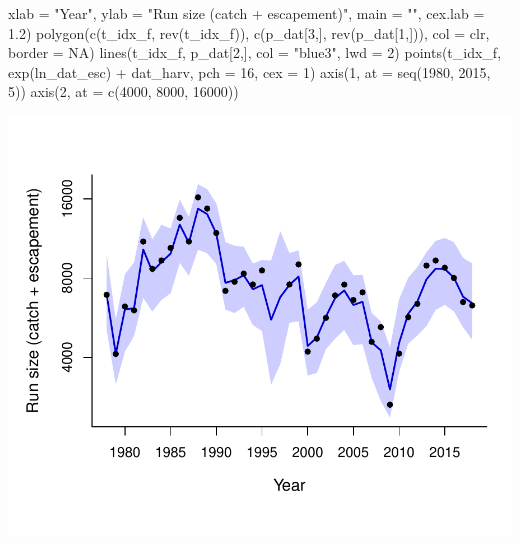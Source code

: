 \documentclass[
  11pt,
]{article}
\newenvironment{Shaded}{}{}
\newcommand{\AttributeTok}[1]{#1}
\newcommand{\ConstantTok}[1]{#1}
\newcommand{\DecValTok}[1]{#1}
\newcommand{\FloatTok}[1]{#1}
\newcommand{\FunctionTok}[1]{#1}
\newcommand{\NormalTok}[1]{#1}
\newcommand{\SpecialCharTok}[1]{\textcolor[rgb]{0.00,0.50,0.50}{#1}}
\newcommand{\StringTok}[1]{\textcolor[rgb]{0.00,0.50,0.50}{#1}}
\begin{document}
\begin{Shaded}
\begin{Highlighting}[]
     \AttributeTok{xlab =} \StringTok{"Year"}\NormalTok{, }\AttributeTok{ylab =} \StringTok{"Run size (catch + escapement)"}\NormalTok{, }\AttributeTok{main =} \StringTok{""}\NormalTok{, }\AttributeTok{cex.lab =} \FloatTok{1.2}\NormalTok{)}
\FunctionTok{polygon}\NormalTok{(}\FunctionTok{c}\NormalTok{(t\_idx\_f, }\FunctionTok{rev}\NormalTok{(t\_idx\_f)), }\FunctionTok{c}\NormalTok{(p\_dat[}\DecValTok{3}\NormalTok{,], }\FunctionTok{rev}\NormalTok{(p\_dat[}\DecValTok{1}\NormalTok{,])),}
        \AttributeTok{col =}\NormalTok{ clr, }\AttributeTok{border =} \ConstantTok{NA}\NormalTok{)}
\FunctionTok{lines}\NormalTok{(t\_idx\_f, p\_dat[}\DecValTok{2}\NormalTok{,], }\AttributeTok{col =} \StringTok{"blue3"}\NormalTok{, }\AttributeTok{lwd =} \DecValTok{2}\NormalTok{)}
\FunctionTok{points}\NormalTok{(t\_idx\_f, }\FunctionTok{exp}\NormalTok{(ln\_dat\_esc) }\SpecialCharTok{+}\NormalTok{ dat\_harv, }\AttributeTok{pch =} \DecValTok{16}\NormalTok{, }\AttributeTok{cex =} \DecValTok{1}\NormalTok{)}
\FunctionTok{axis}\NormalTok{(}\DecValTok{1}\NormalTok{, }\AttributeTok{at =} \FunctionTok{seq}\NormalTok{(}\DecValTok{1980}\NormalTok{, }\DecValTok{2015}\NormalTok{, }\DecValTok{5}\NormalTok{))}
\FunctionTok{axis}\NormalTok{(}\DecValTok{2}\NormalTok{, }\AttributeTok{at =} \FunctionTok{c}\NormalTok{(}\DecValTok{4000}\NormalTok{, }\DecValTok{8000}\NormalTok{, }\DecValTok{16000}\NormalTok{))}
\end{Highlighting}
\end{Shaded}

\begin{center}\includegraphics{App_3_Summarize_results_files/figure-latex/fig_2_run_size-1} \end{center}
\end{document}
